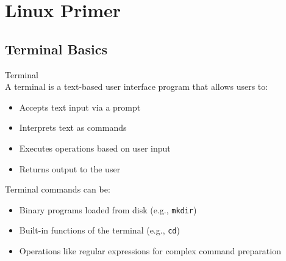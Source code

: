 \section{Linux Primer}

\subsection{Terminal Basics}


\begin{definition}{Terminal}\\
    A terminal is a text-based user interface program that allows users to:
    \begin{itemize}
        \item Accepts text input via a prompt
        \item Interprets text as commands
        \item Executes operations based on user input
        \item Returns output to the user
    \end{itemize}
    \vspace{2mm}
    Terminal commands can be:
    \begin{itemize}
        \item Binary programs loaded from disk (e.g., \texttt{mkdir})
        \item Built-in functions of the terminal (e.g., \texttt{cd})
        \item Operations like regular expressions for complex command preparation
    \end{itemize}
\end{definition}

